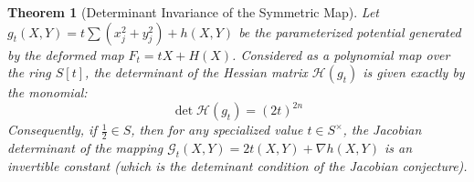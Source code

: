 \documentclass[11pt,a4paper]{article}
\newtheorem{theorem}{Theorem}[section]
\begin{document}
\begin{theorem}[Determinant Invariance of the Symmetric Map]
\label{thm:hessian_determinant}
Let $g_t(X,\allowbreak Y) = t \sum (x_j^2 + y_j^2) + h(X,Y)$ be the parameterized potential generated by the deformed map $F_t = tX + H(X)$. Considered as a polynomial map over the ring $S[t]$, the determinant of the Hessian matrix $\mathcal{H}(g_t)$ is given exactly by the monomial:
\begin{equation}
\det \mathcal{H}(g_t) = (2t)^{2n}
\end{equation}
Consequently, if $\frac12 \in S$, then for any specialized value $t \in S^\times$, the Jacobian determinant of the mapping $\mathcal{G}_t(X,Y) = 2t(X,Y) + \nabla h(X,Y)$ is an invertible constant (which is the deteminant condition of the Jacobian conjecture).
\end{theorem}
\end{document}
